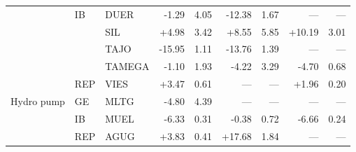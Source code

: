 \begin{tabular}{l l l r r r r r r}
 & IB & DUER & -1.29 & 4.05 & -12.38 & 1.67 & --- & --- \\
 &  & SIL & +4.98 & 3.42 & +8.55 & 5.85 & +10.19 & 3.01 \\
 &  & TAJO & -15.95 & 1.11 & -13.76 & 1.39 & --- & --- \\
 &  & TAMEGA & -1.10 & 1.93 & -4.22 & 3.29 & -4.70 & 0.68 \\
 & REP & VIES & +3.47 & 0.61 & --- & --- & +1.96 & 0.20 \\
\addlinespace
Hydro pump & GE & MLTG & -4.80 & 4.39 & --- & --- & --- & --- \\
 & IB & MUEL & -6.33 & 0.31 & -0.38 & 0.72 & -6.66 & 0.24 \\
 & REP & AGUG & +3.83 & 0.41 & +17.68 & 1.84 & --- & --- \\
\bottomrule
\end{tabular}